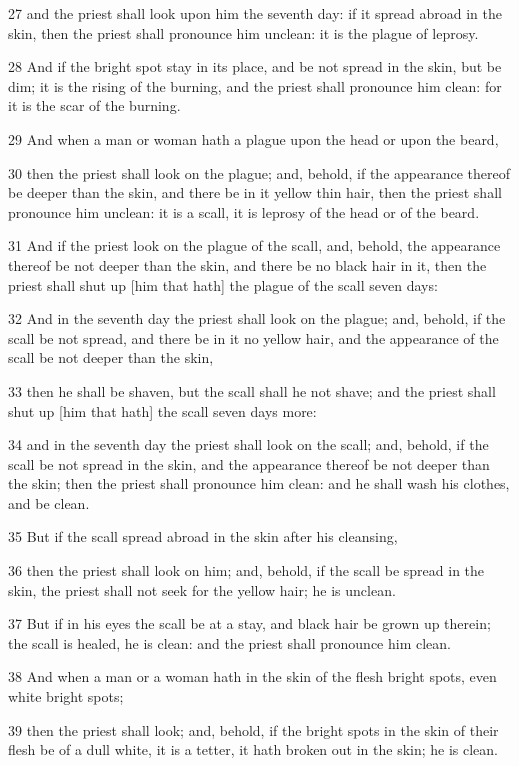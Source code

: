 \par 27 and the priest shall look upon him the seventh day: if it spread abroad in the skin, then the priest shall pronounce him unclean: it is the plague of leprosy.
\par 28 And if the bright spot stay in its place, and be not spread in the skin, but be dim; it is the rising of the burning, and the priest shall pronounce him clean: for it is the scar of the burning.
\par 29 And when a man or woman hath a plague upon the head or upon the beard,
\par 30 then the priest shall look on the plague; and, behold, if the appearance thereof be deeper than the skin, and there be in it yellow thin hair, then the priest shall pronounce him unclean: it is a scall, it is leprosy of the head or of the beard.
\par 31 And if the priest look on the plague of the scall, and, behold, the appearance thereof be not deeper than the skin, and there be no black hair in it, then the priest shall shut up [him that hath] the plague of the scall seven days:
\par 32 And in the seventh day the priest shall look on the plague; and, behold, if the scall be not spread, and there be in it no yellow hair, and the appearance of the scall be not deeper than the skin,
\par 33 then he shall be shaven, but the scall shall he not shave; and the priest shall shut up [him that hath] the scall seven days more:
\par 34 and in the seventh day the priest shall look on the scall; and, behold, if the scall be not spread in the skin, and the appearance thereof be not deeper than the skin; then the priest shall pronounce him clean: and he shall wash his clothes, and be clean.
\par 35 But if the scall spread abroad in the skin after his cleansing,
\par 36 then the priest shall look on him; and, behold, if the scall be spread in the skin, the priest shall not seek for the yellow hair; he is unclean.
\par 37 But if in his eyes the scall be at a stay, and black hair be grown up therein; the scall is healed, he is clean: and the priest shall pronounce him clean.
\par 38 And when a man or a woman hath in the skin of the flesh bright spots, even white bright spots;
\par 39 then the priest shall look; and, behold, if the bright spots in the skin of their flesh be of a dull white, it is a tetter, it hath broken out in the skin; he is clean.
